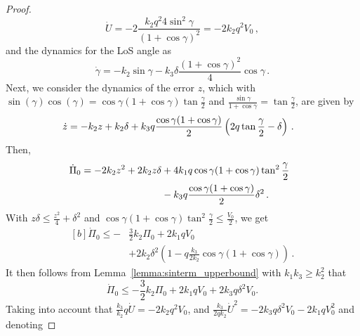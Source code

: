 \documentclass[letterpaper, 10 pt, conference]{ieeeconf}  %
\begin{document}
\begin{proof}
\begin{equation}
\dot U  = -2 \frac{k_2  q^2 4 \sin^2\gamma}{(1+\cos\gamma)^2} = - 2 k_2 q^2 V_0\,,
\end{equation}
and the dynamics for the LoS angle as
\begin{equation}
\dot\gamma = - k_2 \sin\gamma -  k_3 \delta\frac{(1+\cos\gamma)^2}{4} \cos\gamma  \,.
\end{equation}
Next, we consider the dynamics of the error $z$, which with
 $\sin(\gamma)\cos(\gamma) = \cos\gamma(1+\cos\gamma) \tan\frac{\gamma}{2}$ and $\frac{\sin\gamma}{1+\cos\gamma} =\tan\frac{\gamma}{2} $, are given by
\begin{equation}
\hspace*{-0.3cm}
\dot z = -k_2z + k_2\delta + k_3 q \frac{\cos\gamma(1+\cos\gamma)}{2}\left( 2 q \tan\frac{\gamma}{2}-\delta\right)\,.    
\end{equation}
Then,
\begin{equation}
\hspace*{-0.2cm}
\begin{aligned}[b]
\dot \Pi_0 = - 2k_2z^2 + 2k_2 z \delta &+ 
4 k_1 q \cos\gamma(1+\cos\gamma) \tan^2\frac{\gamma}{2} \\
&  
-k_3 q \frac{\cos\gamma(1+\cos\gamma)} {2}\delta^2\,.
\end{aligned}
\end{equation}
With $z\delta \leq  \frac{z^2}{4} + \delta^2$ and $\cos\gamma(1+\cos\gamma) \tan^2\frac{\gamma}{2} \leq  \frac{V_0}{2}
$, we get
\begin{equation}
\begin{aligned}[b]
    \dot \Pi_0 \le - &\frac{3}{2}k_2 \Pi_0 + 2 k_ 1 q V_0 \\
&+ 2 k_2 \delta^2\left(1- q \frac{k_3 }{2 k_2} 
\cos\gamma(1+\cos\gamma)\right)\,.
\end{aligned}
\end{equation}
It then follows from Lemma~\ref{lemma:sinterm_upperbound} with $k_1 k_3 \ge  k_2^2$ that 
\begin{equation}
\dot\Pi_0 
\leq - \frac{3}{2} k_2 \Pi_0 + 2 k_1 q  V_0 +   2 k_3 q \delta^2 V_0.
\end{equation}
Taking into account that $\frac{k_3 }{k_2} q \dot U = - 2k_2 q^2 V_0$, and $\frac{k_3}{2q k_2 } \dot{U}^2 = -2k_3 q \delta^2 V_0 - 2k_1 q V_0^2$ and denoting

\end{proof}
\end{document}
